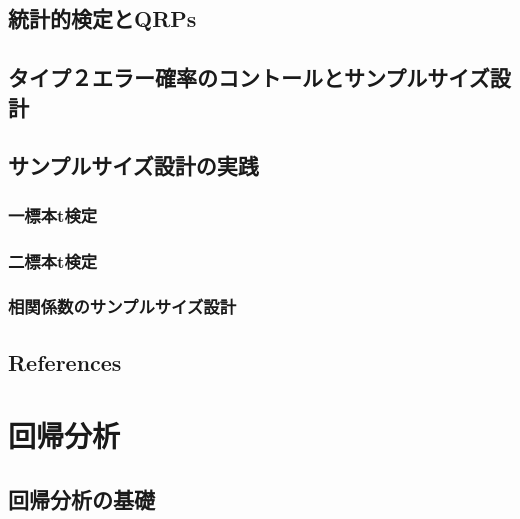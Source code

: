 \documentclass[
  a4paper,
]{ltjsbook}
\begin{document}
\section{統計的検定とQRPs}\label{ux7d71ux8a08ux7684ux691cux5b9aux3068qrps}

\section{タイプ２エラー確率のコントールとサンプルサイズ設計}\label{ux30bfux30a4ux30d7uxff12ux30a8ux30e9ux30fcux78baux7387ux306eux30b3ux30f3ux30c8ux30fcux30ebux3068ux30b5ux30f3ux30d7ux30ebux30b5ux30a4ux30baux8a2dux8a08}

\section{サンプルサイズ設計の実践}\label{ux30b5ux30f3ux30d7ux30ebux30b5ux30a4ux30baux8a2dux8a08ux306eux5b9fux8df5}

\subsection{一標本t検定}\label{ux4e00ux6a19ux672ctux691cux5b9a}

\subsection{二標本t検定}\label{ux4e8cux6a19ux672ctux691cux5b9a}

\subsection{相関係数のサンプルサイズ設計}\label{ux76f8ux95a2ux4fc2ux6570ux306eux30b5ux30f3ux30d7ux30ebux30b5ux30a4ux30baux8a2dux8a08}

\section{References}\label{references-3}



\chapter{回帰分析}\label{ux56deux5e30ux5206ux6790}

\section{回帰分析の基礎}\label{ux56deux5e30ux5206ux6790ux306eux57faux790e}
\end{document}
